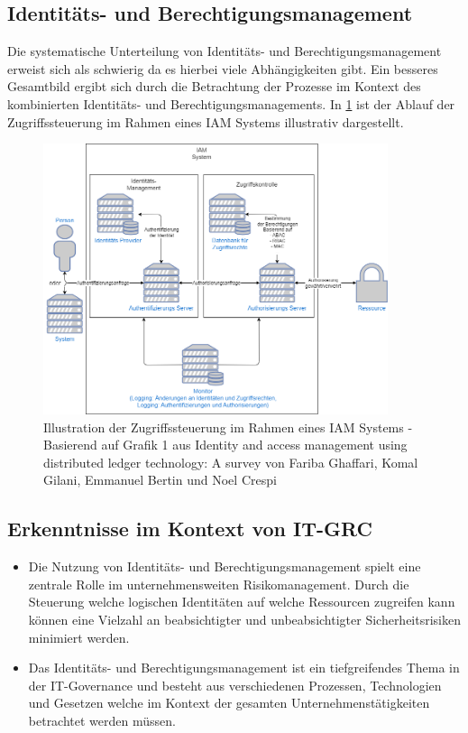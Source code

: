 \documentclass[11pt]{article}
\begin{document}
\subsection{Identitäts- und Berechtigungsmanagement}
Die systematische Unterteilung von Identitäts- und Berechtigungsmanagement erweist sich als schwierig da es hierbei viele Abhängigkeiten gibt. Ein besseres Gesamtbild ergibt sich durch die Betrachtung der Prozesse im Kontext des kombinierten Identitäts- und Berechtigungsmanagements. In \cref{figure:iam} ist der Ablauf der Zugriffssteuerung im Rahmen eines IAM Systems illustrativ dargestellt.
\begin{figure}[H]
  \centering
  \includegraphics[width=0.9\textwidth]{assets/accessmanagement2.png}
  \caption{Illustration der Zugriffssteuerung im Rahmen eines IAM Systems - Basierend auf Grafik 1 aus Identity and access management using distributed ledger technology: A survey von Fariba Ghaffari, Komal Gilani, Emmanuel Bertin und Noel Crespi}\label{figure:iam}
\end{figure}
\subsection{Erkenntnisse im Kontext von IT-GRC}
\begin{itemize}
  \item Die Nutzung von Identitäts- und Berechtigungsmanagement spielt eine zentrale Rolle im unternehmensweiten Risikomanagement. Durch die Steuerung welche logischen Identitäten auf welche Ressourcen zugreifen kann können eine Vielzahl an beabsichtigter und unbeabsichtigter Sicherheitsrisiken minimiert werden.
  \item Das Identitäts- und Berechtigungsmanagement ist ein tiefgreifendes Thema in der IT-Governance und besteht aus verschiedenen Prozessen, Technologien und Gesetzen welche im Kontext der gesamten Unternehmenstätigkeiten betrachtet werden müssen.
\end{itemize}
\end{document}
